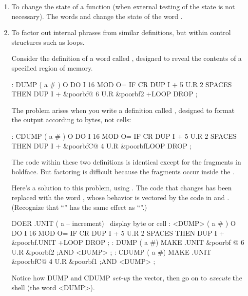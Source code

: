 \begin{enumerate}
\item To change the state of a function (when external testing of the state is not
necessary). The words  and  change the state of
the word .

\item To factor out internal phrases from similar definitions, but within control
structures such as loops.

Consider the definition of a word called , designed to reveal the
contents of a specified region of memory.


\begin{Code}[commandchars=\&\{\}]
: DUMP  ( a # )
   O DO  I 16 MOD O= IF  CR  DUP I +  5 U.R  2 SPACES  THEN
   DUP I +  &poorbf{@ 6} U.R  &poorbf{2 +LOOP}  DROP ;
\end{Code}
The problem arises when you write a definition called , designed to
format the output according to bytes, not cells:

\begin{Code}[commandchars=\&\{\}]
: CDUMP  ( a # )
   O DO  I 16 MOD O= IF  CR  DUP I +  5 U.R  2 SPACES  THEN
   DUP I +  &poorbf{C@  4} U.R  &poorbf{LOOP} DROP ;
\end{Code}

The code within these two definitions is identical except for the fragments
in boldface. But factoring is difficult because the fragments occur inside the
.

Here's a solution to this problem, using . The code that
changes has been replaced with the word , whose behavior is vectored
by the code in  and . (Recognize that ``'' has
the same effect as ``''.)

\begin{Code}[commandchars=\&\{\}]
DOER .UNIT ( a -- increment)  \ display byte or cell
: <DUMP>  ( a # )
   O DO  I 16 MOD O= IF  CR  DUP I +  5 U.R  2 SPACES  THEN
   DUP I + &poorbf{.UNIT}  +LOOP  DROP ;
: DUMP   ( a #)  MAKE .UNIT &poorbf{ @  6} U.R  &poorbf{2} ;AND <DUMP> ;
: CDUMP ( a #)   MAKE .UNIT &poorbf{C@  4} U.R  &poorbf{1} ;AND <DUMP> ;
\end{Code}
Notice how DUMP and CDUMP \emph{set-up} the vector, then go on to
\emph{execute} the shell (the word <DUMP>).


\end{enumerate}
